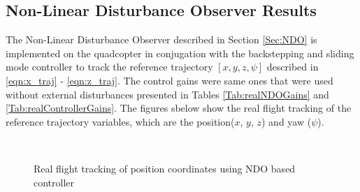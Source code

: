 \documentclass[letterpaper%
, twoside%
, 12pt%
,memoire%
, english%
,creativecommons,hyperref%
]{thETS}
\begin{document}
\subsection{Non-Linear Disturbance Observer Results}
The Non-Linear Disturbance Observer described in Section \ref{Sec:NDO} is implemented on the quadcopter in conjugation with the backstepping and sliding mode controller to track the reference trajectory $[x,y,z,\psi]$ described in \eqref{eqn:x_traj} - \eqref{eqn:z_traj}. The control gains were same ones that were used without external disturbances  presented in Tables \ref{Tab:realNDOGains} and \ref{Tab:realControllerGains}. The figures sbelow show the real flight tracking of the reference trajectory variables, which are the position($x$, $y$, $z$) and yaw ($\psi$). 
\begin{figure}[H]
	\centering
	 \\ \parbox{0.75\textwidth}{\caption{Real flight tracking of position coordinates using NDO based controller\label{Fig:xyztracNDODist}}}
\end{figure}
\end{document}
